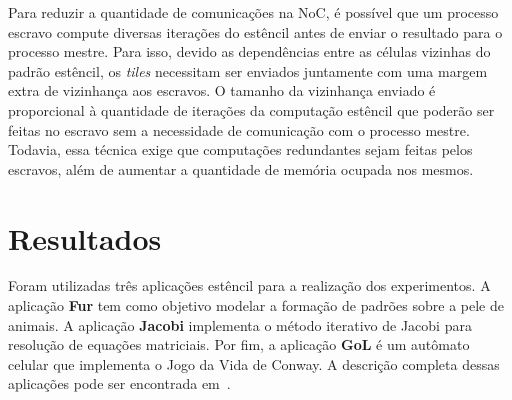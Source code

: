 \documentclass[12pt]{article}
\begin{document}
%
Para reduzir a quantidade de comunicações na NoC, é possível que um processo
escravo compute diversas iterações do estêncil antes de enviar o resultado para
o processo mestre.
Para isso, devido as dependências entre as células vizinhas do padrão estêncil,
os \textit{tiles} necessitam ser enviados juntamente com uma margem extra de
vizinhança aos escravos.
O tamanho da vizinhança enviado é proporcional à quantidade de iterações da
computação estêncil que poderão ser feitas no escravo sem a necessidade de
comunicação com o processo mestre. Todavia, essa técnica exige que computações
redundantes sejam feitas pelos escravos, além de aumentar a quantidade de
memória ocupada nos mesmos.

\section{Resultados}
\label{sec:resultados}

Foram utilizadas três aplicações estêncil para a realização dos experimentos. A
aplicação \textbf{Fur} tem como objetivo modelar a formação de padrões sobre a
pele de animais. A aplicação \textbf{Jacobi} implementa o método iterativo de
Jacobi para resolução de equações matriciais. Por fim, a aplicação \textbf{GoL}
é um autômato celular que implementa o Jogo da Vida de Conway. A descrição
completa dessas aplicações pode ser encontrada em~\cite{pereira15,
Castro-Podesta-ERAD:2016}.
\end{document}
